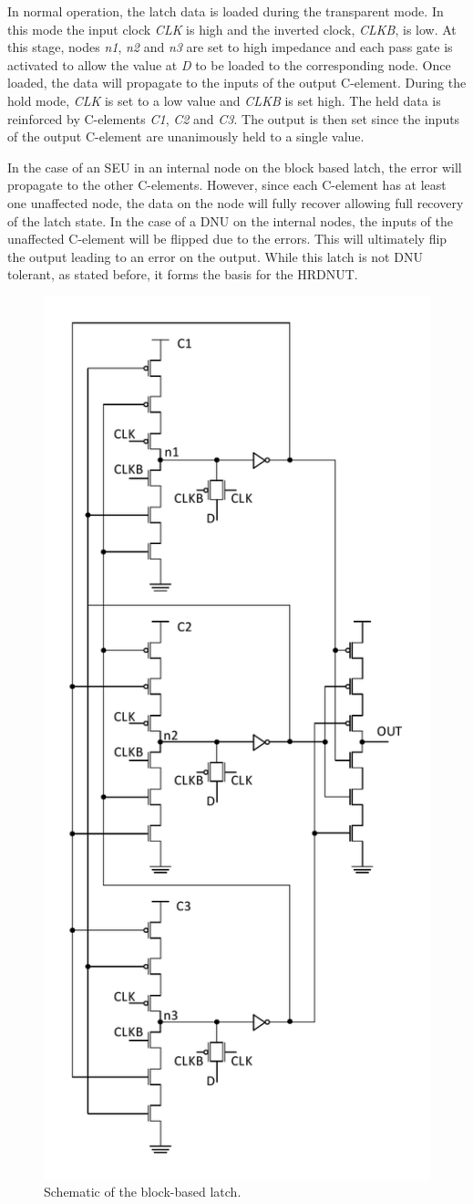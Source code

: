 In normal operation, the latch data is loaded during the transparent mode. In this mode the input clock \textit{CLK} is high and the inverted clock, \textit{CLKB}, is low. At this stage, nodes \textit{n1}, \textit{n2} and \textit{n3} are set to high impedance and each pass gate is activated to allow the value at \textit{D} to be loaded to the corresponding node. Once loaded, the data will propagate to the inputs of the output C-element. During the hold mode, \textit{CLK} is set to a low value and \textit{CLKB} is set high. The held data is reinforced by C-elements \textit{C1}, \textit{C2} and \textit{C3}. The output is then set since the inputs of the output C-element are unanimously held to a single value.

In the case of an SEU in an internal node on the block based latch, the error will propagate to the other C-elements. However, since each C-element has at least one unaffected node, the data on the node will fully recover allowing full recovery of the latch state. In the case of a DNU on the internal nodes, the inputs of the unaffected C-element will be flipped due to the errors. This will ultimately flip the output leading to an error on the output. While this latch is not DNU tolerant, as stated before, it forms the basis for the HRDNUT.

\begin{figure}[!htbp]
	\centering
	\includegraphics[width=0.55\linewidth]{Figures/BLatch}
	\caption{Schematic of the block-based latch.}
	\label{BLatch}
\end{figure} 

